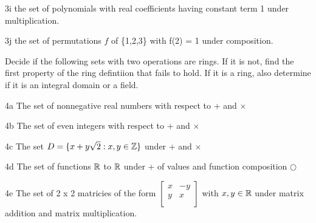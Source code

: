 \begin{question}{3i}
the set of polynomials with real coefficients having constant term 1 under multiplication.
\end{question}


\begin{question}{3j}
the set of permutations $f$ of \{1,2,3\} with f(2) = 1 under composition.
\end{question}


\begin{question}{4}
Decide if the following sets with two operations are rings. If it is not, find the first property of the ring defintiion that fails to hold. If it is a ring, also determine if it is an integral domain or a field.
\end{question}

\begin{question}{4a}
The set of nonnegative real numbers with respect to + and $\times$
\end{question}

\begin{question}{4b}
The set of even integers with respect to + and $\times$
\end{question}

\begin{question}{4c}
The set $D = \{x+y\sqrt{2} : x, y \in \mathbb{Z}\}$ under + and $\times$
\end{question}

\begin{question}{4d}
The set of functions $\mathbb{R}$ to $\mathbb{R}$ under + of values and function composition $\bigcirc$
\end{question}

\begin{question}{4e}
The set of 2 x 2 matricies of the form $\begin{bmatrix}
  x & -y \\
  y & x  \\
 \end{bmatrix}$ with $x,y \in \mathbb{R}$ under matrix addition and matrix multiplication. 
\end{question}

